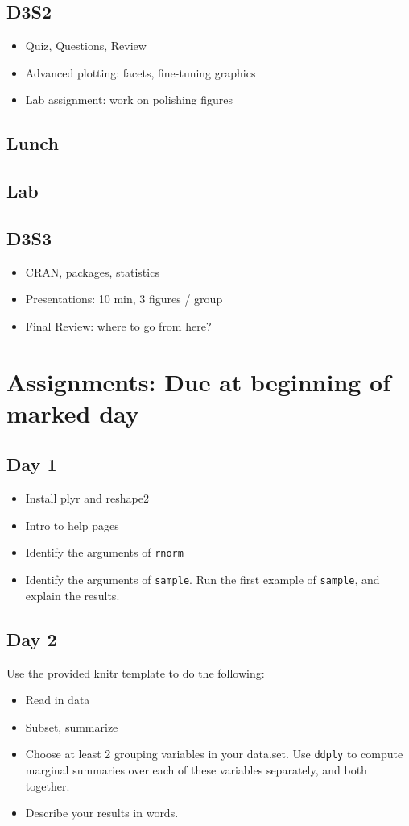 \documentclass[english, letterpaper, 12pt]{article}
\begin{document}
\subsection*{D3S2}
\begin{itemize}
    \item Quiz, Questions, Review
    \item Advanced plotting: facets, fine-tuning graphics
    \item Lab assignment: work on polishing figures 
\end{itemize}

\subsection*{Lunch}
\subsection*{Lab}
\subsection*{D3S3}
\begin{itemize}
    \item CRAN, packages, statistics
    \item Presentations: 10 min, 3 figures / group
    \item Final Review: where to go from here?
\end{itemize}

\clearpage
\section*{Assignments: Due at beginning of marked day}
\subsection*{Day 1}
\begin{itemize}
    \item Install plyr and reshape2
    \item Intro to help pages
    \item Identify the arguments of \texttt{rnorm}
    \item Identify the arguments of \texttt{sample}. Run the first example of
\texttt{sample}, and explain the results.
\end{itemize}

\subsection*{Day 2}
Use the provided knitr template to do the following:
\begin{itemize}
    \item Read in data
    \item Subset, summarize
    \item Choose at least 2 grouping variables in your data.set.  Use
\texttt{ddply} to compute marginal summaries over each of these variables
separately, and both together. 
    \item Describe your results in words.
\end{itemize}
\end{document}
